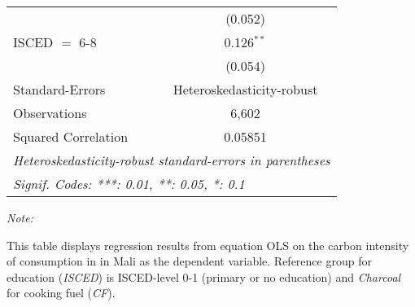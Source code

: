 \begin{table}[htbp!]
\begin{adjustbox}{width = 1\textwidth, max height = 0.95\textheight, center}
\begin{threeparttable}[b]
\begin{tabular}{lc}
                                & (0.052)\\   
            ISCED $=$ 6-8       & 0.126$^{**}$\\   
                                & (0.054)\\   
            \midrule 
            Standard-Errors     & Heteroskedasticity-robust \\   
            Observations        & 6,602\\  
            Squared Correlation & 0.05851\\  
            \midrule \midrule
            \multicolumn{2}{l}{\emph{Heteroskedasticity-robust standard-errors in parentheses}}\\
            \multicolumn{2}{l}{\emph{Signif. Codes: ***: 0.01, **: 0.05, *: 0.1}}\\
         \end{tabular}
         
         \begin{tablenotes}\item \medskip \textit{Note:}
            \item This table displays regression results from equation OLS on the carbon intensity of consumption in  in Mali as the dependent variable. Reference group for education (\textit{ISCED}) is ISCED-level 0-1 (primary or no education) and \textit{Charcoal} for cooking fuel (\textit{CF}).
         \end{tablenotes}
      \end{threeparttable}
   \end{adjustbox}
\end{table}


